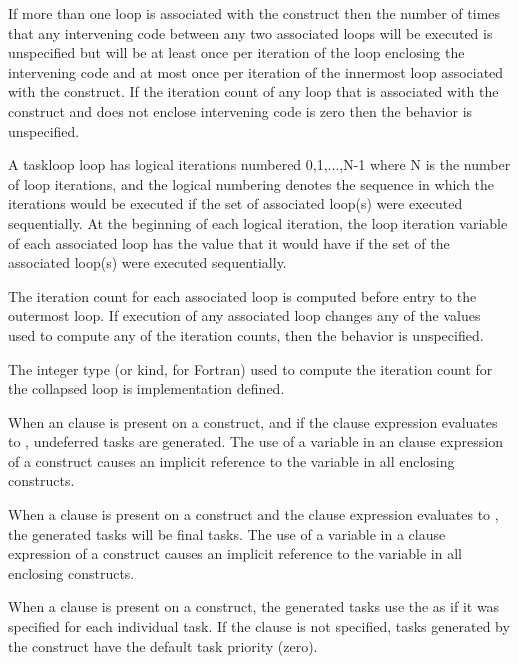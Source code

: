 If more than one loop is associated with the  construct
then the number of times that any intervening code between any two
associated loops will be executed is unspecified but will be at least
once per iteration of the loop enclosing the intervening code and at
most once per iteration of the innermost loop associated with the
construct.  If the iteration count of any loop that is associated with the
 construct and does not enclose intervening code is zero
then the behavior is unspecified.


A taskloop loop has logical iterations numbered 0,1,...,N-1 where N is
the number of loop iterations, and the logical numbering denotes the
sequence in which the iterations would be executed if the set of
associated loop(s) were executed sequentially.  At the beginning of
each logical iteration, the loop iteration variable of each associated
loop has the value that it would have if the set of the associated
loop(s) were executed sequentially.

The iteration count for each associated loop is computed before entry 
to the outermost loop. If execution of any associated loop changes any 
of the values used to compute any of the iteration counts, then the 
behavior is unspecified.

The integer type (or kind, for Fortran) used to compute the iteration 
count for the collapsed loop is implementation defined.

When an  clause is present on a  construct, and 
if the  clause expression evaluates to , undeferred 
tasks are generated. The use of a variable in an  clause expression 
of a  construct causes an implicit reference to the variable 
in all enclosing constructs.

When a  clause is present on a  construct and 
the  clause expression evaluates to , the generated 
tasks will be final tasks. The use of a variable in a  clause 
expression of a  construct causes an implicit reference to 
the variable in all enclosing constructs.

When a  clause is present on a  construct,
the generated tasks use the  as if it was specified 
for each individual task. If the  clause is not specified, 
tasks generated by the  construct have the default task 
priority (zero).

